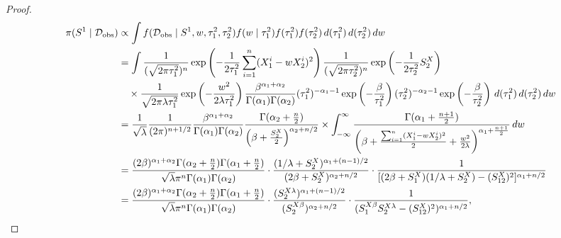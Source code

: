 \documentclass[10pt,a4paper]{amsart}
\newcommand{\obsdata}{\train_{\text{obs}}}
\newcommand{\train}{\mathcal{D}}
\begin{document}
\begin{proof}
    \begin{align}
        \notag \pi(S^1\mid\obsdata) &\propto \int f(\obsdata\mid S^1, w, \tau_1^2, \tau_2^2) f(w\mid\tau_1^2)f(\tau_1^2)f(\tau_2^2)\, d(\tau_1^2)\, d(\tau_2^2)\, dw \\
        \notag &= \int \frac{1}{(\sqrt{2\pi \tau_1^2})^n}\exp \left(-\frac{1}{2\tau_1^2}\sum_{i=1}^n(X_1^{i}-wX_2^{i})^2 \right) \frac{1}{(\sqrt{2\pi \tau_2^2})^n}\exp \left(-\frac{1}{2\tau_2^2}S_2^X \right) \\
        \notag &\quad \times \frac{1}{\sqrt{2\pi\lambda\tau_1^2}}\exp\left(-\frac{w^2}{2\lambda\tau_1^2} \right) \frac{\beta^{\alpha_1+\alpha_2}}{\Gamma(\alpha_1)\Gamma(\alpha_2)} (\tau_1^2)^{-\alpha_1-1} \exp \left(-\frac{\beta}{\tau_1^2} \right) (\tau_2^2)^{-\alpha_2-1} \exp \left(-\frac{\beta}{\tau_2^2} \right)\, d(\tau_1^2)\, d(\tau_2^2)\, dw \\
        \notag &= \frac{1}{\sqrt{\lambda}} \frac{1}{(2\pi)^{n+1/2}} \frac{\beta^{\alpha_1+\alpha_2}}{\Gamma(\alpha_1)\Gamma(\alpha_2)} \frac{\Gamma(\alpha_2+\frac{n}{2})}{\left( \beta + \frac{S_2^X}{2} \right)^{\alpha_2+n/2}}\times \int_{-\infty}^\infty \frac{\Gamma(\alpha_1+\frac{n+1}{2})}{\left( \beta+ \frac{\sum_{i=1}^n(X_1^{i}-wX_2^{i})^2}{2} +\frac{w^2}{2\lambda}   \right)^{\alpha_1+\frac{n+1}{2}}} \, dw \\
        \notag &= \frac{(2\beta)^{\alpha_1+\alpha_2} \Gamma(\alpha_2+\frac{n}{2})\Gamma(\alpha_1+\frac{n}{2})}{\sqrt{\lambda} \pi^n \Gamma(\alpha_1)\Gamma(\alpha_2)} \cdot \frac{(1/\lambda + S_2^X)^{\alpha_1+(n-1)/2}}{(2\beta + S_2^X)^{\alpha_2+n/2}} \cdot \frac{1}{[(2\beta+S_1^X)(1/\lambda+S_2^X) - (S_{12}^X)^2]^{\alpha_1+n/2}}\\
        &= \frac{(2\beta)^{\alpha_1+\alpha_2} \Gamma(\alpha_2+\frac{n}{2})\Gamma(\alpha_1+\frac{n}{2})}{\sqrt{\lambda} \pi^n \Gamma(\alpha_1)\Gamma(\alpha_2)} \cdot \frac{ (S_2^{X\lambda})^{\alpha_1+(n-1)/2}}{(S_2^{X\beta})^{\alpha_2+n/2}} \cdot \frac{1}{(S_1^{X\beta} S_2^{X\lambda} - (S_{12}^X)^2)^{\alpha_1+n/2}},
        \label{eq:post_G1}
    \end{align}


\end{proof}
\end{document}
